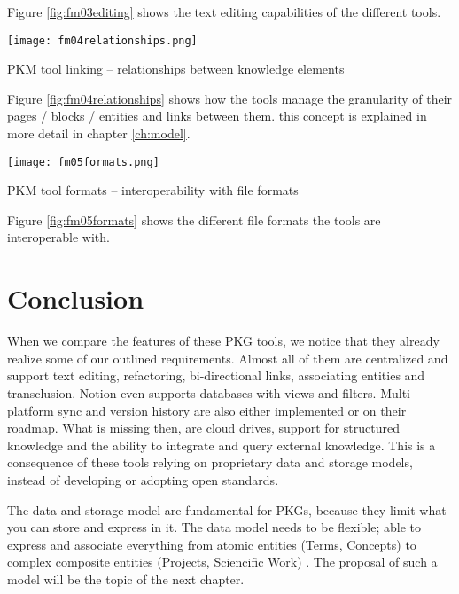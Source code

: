 Figure \ref{fig:fm03editing} shows the text editing capabilities of the different tools.


\begin{table}[H]
    \centering
    \texttt{[image: fm04relationships.png]}
    \caption{PKM tool linking -- relationships between knowledge elements}
    \label{fig:fm04relationships}
\end{table}

Figure \ref{fig:fm04relationships} shows how the tools manage the granularity of their pages / blocks / entities and links between them. this concept is explained in more detail in chapter \ref{ch:model}.


\begin{table}[H]
    \centering
    \texttt{[image: fm05formats.png]}
    \caption{PKM tool formats -- interoperability with file formats}
    \label{fig:fm05formats}
\end{table}

Figure \ref{fig:fm05formats} shows the different file formats the tools are interoperable with.

\section{Conclusion}

When we compare the features of these PKG tools, we notice that they already realize some of our outlined requirements. Almost all of them are centralized and support text editing, refactoring, bi-directional links, associating entities and transclusion. Notion even supports databases with views and filters. Multi-platform sync and version history are also either implemented or on their roadmap. What is missing then, are cloud drives, support for structured knowledge and the ability to integrate and query external knowledge. This is a consequence of these tools relying on proprietary data and storage models, instead of developing or adopting open standards.

The data and storage model are fundamental for PKGs, because they limit what you can store and express in it. The data model needs to be flexible; able to express and associate everything from atomic entities (Terms, Concepts) to complex composite entities (Projects, Sciencific Work) \cite{Davies2005Memex60}. The proposal of such a model will be the topic of the next chapter.